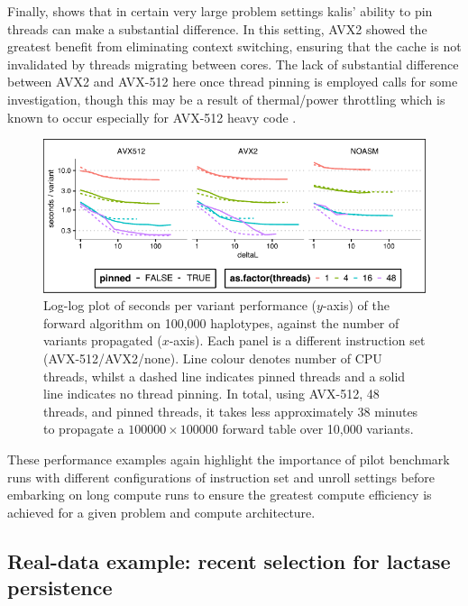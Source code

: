 \documentclass[pdflatex,referee,lineno,sn-nature]{sn-jnl}%
\newcommand{\pkg}[1]{{\fontseries{m}\fontseries{b}\selectfont #1}}
\begin{document}
Finally,  shows that in certain very large problem settings \pkg{kalis}' ability to pin threads can make a substantial difference.
In this setting, AVX2 showed the greatest benefit from eliminating context switching, ensuring that the cache is not invalidated by threads migrating between cores.
The lack of substantial difference between AVX2 and AVX-512 here once thread pinning is employed calls for some investigation, though this may be a result of thermal/power throttling which is known to occur especially for AVX-512 heavy code \citep{schone2019energy}.

\begin{figure}
  \centering
  \includegraphics{fig4}
	\caption{
	  Log-log plot of seconds per variant performance ($y$-axis) of the forward algorithm on 100,000 haplotypes, against the number of variants propagated ($x$-axis).
	  Each panel is a different instruction set (AVX-512/AVX2/none).
	  Line colour denotes number of CPU threads, whilst a dashed line indicates pinned threads and a solid line indicates no thread pinning.
	  In total, using AVX-512, 48 threads, and pinned threads, it takes less approximately 38 minutes to propagate a $100000 \times 100000$ forward table over 10,000 variants.
	}
	\label{fig:perfdeltaL2}
\end{figure}

These performance examples again highlight the importance of pilot benchmark runs with different configurations of instruction set and unroll settings before embarking on long compute runs to ensure the greatest compute efficiency is achieved for a given problem and compute architecture.



\subsection*{Real-data example: recent selection for lactase persistence}
\label{sec:realdata}
\end{document}
